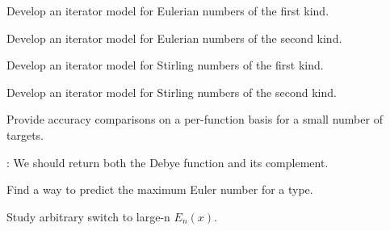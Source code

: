 
\begin{DoxyRefList}
\item[\label{todo__todo000002}%
\hypertarget{todo__todo000002}{}%
Member \hyperlink{group__gnu__math__spec__func_gadfd8810a97655d2cdd1b0e3af68a79d3}{\+\_\+\+\_\+gnu\+\_\+cxx\+:\+:eulerian\+\_\+1} (unsigned int \+\_\+\+\_\+n, unsigned int \+\_\+\+\_\+m)]Develop an iterator model for Eulerian numbers of the first kind.  
\item[\label{todo__todo000003}%
\hypertarget{todo__todo000003}{}%
Member \hyperlink{group__gnu__math__spec__func_ga9bc456941d5e35cf54ec9c50f2e52884}{\+\_\+\+\_\+gnu\+\_\+cxx\+:\+:eulerian\+\_\+2} (unsigned int \+\_\+\+\_\+n, unsigned int \+\_\+\+\_\+m)]Develop an iterator model for Eulerian numbers of the second kind.  
\item[\label{todo__todo000004}%
\hypertarget{todo__todo000004}{}%
Member \hyperlink{group__gnu__math__spec__func_ga2b955dac7d2c5125f2091eaeb25c8ad2}{\+\_\+\+\_\+gnu\+\_\+cxx\+:\+:stirling\+\_\+1} (unsigned int \+\_\+\+\_\+n, unsigned int \+\_\+\+\_\+m)]Develop an iterator model for Stirling numbers of the first kind.  
\item[\label{todo__todo000005}%
\hypertarget{todo__todo000005}{}%
Member \hyperlink{group__gnu__math__spec__func_ga3761c0e467cbe45cbda66a4e796adcd3}{\+\_\+\+\_\+gnu\+\_\+cxx\+:\+:stirling\+\_\+2} (unsigned int \+\_\+\+\_\+n, unsigned int \+\_\+\+\_\+m)]Develop an iterator model for Stirling numbers of the second kind.  
\item[\label{todo__todo000001}%
\hypertarget{todo__todo000001}{}%
page \hyperlink{index}{Mathematical Special Functions} ]Provide accuracy comparisons on a per-\/function basis for a small number of targets. 
\item[\label{todo__todo000019}%
\hypertarget{todo__todo000019}{}%
Member \hyperlink{namespacestd_1_1____detail_a26d3f285cfbcaba6fa30d3e4164c6187}{std\+:\+:\+\_\+\+\_\+detail\+:\+:\+\_\+\+\_\+debye} (unsigned int \+\_\+\+\_\+n, \+\_\+\+Tp \+\_\+\+\_\+x)]\+: We should return both the Debye function and it\textquotesingle{}s complement.  
\item[\label{todo__todo000008}%
\hypertarget{todo__todo000008}{}%
Member \hyperlink{namespacestd_1_1____detail_a2e3eb67dee4d0b5c96824a4e8e9c227e}{std\+:\+:\+\_\+\+\_\+detail\+:\+:\+\_\+\+\_\+euler\+\_\+series} (unsigned int \+\_\+\+\_\+n)]Find a way to predict the maximum Euler number for a type.  
\item[\label{todo__todo000011}%
\hypertarget{todo__todo000011}{}%
Member \hyperlink{namespacestd_1_1____detail_a0282700710ec07b8ca095fe2ec140d6e}{std\+:\+:\+\_\+\+\_\+detail\+:\+:\+\_\+\+\_\+expint} (unsigned int \+\_\+\+\_\+n, \+\_\+\+Tp \+\_\+\+\_\+x)]Study arbitrary switch to large-\/n $ E_n(x) $. 


\end{DoxyRefList}
